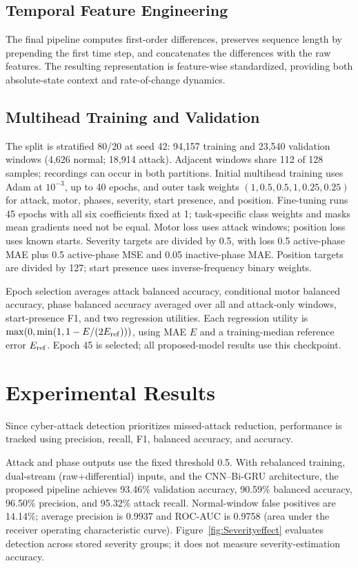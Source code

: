 \documentclass[conference,letterpaper]{IEEEtran}
\begin{document}
\subsection{Temporal Feature Engineering}
The final pipeline computes first-order differences, preserves sequence length by prepending the first time step, and concatenates the differences with the raw features. The resulting representation is feature-wise standardized, providing both absolute-state context and rate-of-change dynamics.


\subsection{Multihead Training and Validation}
The split is stratified 80/20 at seed 42: 94,157 training and 23,540 validation windows (4,626 normal; 18,914 attack). Adjacent windows share 112 of 128 samples; recordings can occur in both partitions.
Initial multihead training uses Adam at $10^{-3}$, up to 40 epochs, and outer task weights $(1,0.5,0.5,1,0.25,0.25)$ for attack, motor, phases, severity, start presence, and position. Fine-tuning runs 45 epochs with all six coefficients fixed at 1; task-specific class weights and masks mean gradients need not be equal. Motor loss uses attack windows; position loss uses known starts. Severity targets are divided by 0.5, with loss 0.5 active-phase MAE plus 0.5 active-phase MSE and 0.05 inactive-phase MAE. Position targets are divided by 127; start presence uses inverse-frequency binary weights.

Epoch selection averages attack balanced accuracy, conditional motor balanced accuracy, phase balanced accuracy averaged over all and attack-only windows, start-presence F1, and two regression utilities. Each regression utility is $\max(0,\min(1,1-E/(2E_{\rm ref})))$, using MAE $E$ and a training-median reference error $E_{\rm ref}$. Epoch 45 is selected; all proposed-model results use this checkpoint.

\section{Experimental Results}

Since cyber-attack detection prioritizes missed-attack reduction, performance is tracked using precision, recall, F1, balanced accuracy, and accuracy.

Attack and phase outputs use the fixed threshold 0.5. With rebalanced training, dual-stream (raw+differential) inputs, and the CNN--Bi-GRU architecture, the proposed pipeline achieves 93.46\% validation accuracy, 90.59\% balanced accuracy, 96.50\% precision, and 95.32\% attack recall. Normal-window false positives are 14.14\%; average precision is 0.9937 and ROC-AUC is 0.9758 (area under the receiver operating characteristic curve). Figure~\ref{fig:Severityeffect} evaluates detection across stored severity groups; it does not measure severity-estimation accuracy.
\end{document}
